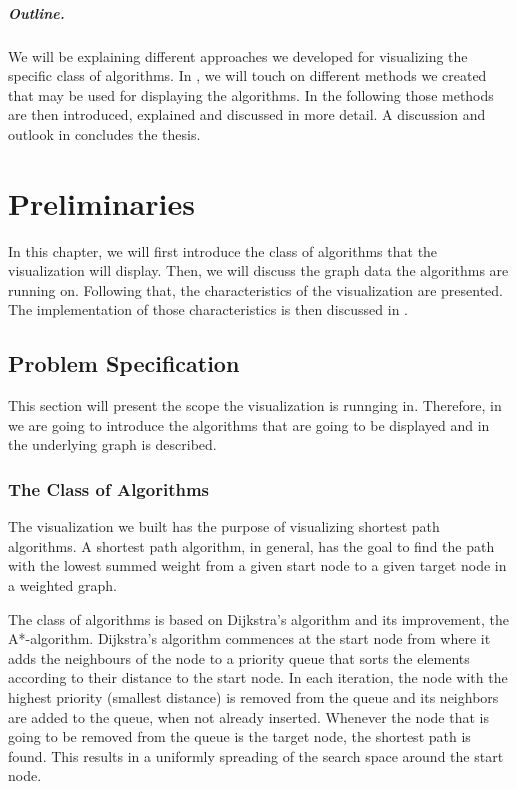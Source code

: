 \documentclass
[
    paper = a4,
    pagesize,
    12 pt,
    oneside,                       %
    open = right,
    DIV = calc,
    BCOR = 0 mm,                   %
    bibtotoc
]
{scrbook}
\begin{document}
\paragraph{Outline.} We will be explaining different approaches we developed for visualizing the specific class of algorithms.
In , we will touch on different methods we created that may be used for displaying the algorithms.
In the following  those methods are then introduced, explained and discussed in more detail.
A discussion and outlook in  concludes the thesis.


\chapter{Preliminaries} \label{questions}

In this chapter, we will first introduce the class of algorithms that the visualization will display.
Then, we will discuss the graph data the algorithms are running on.
Following that, the characteristics of the visualization are presented.
The implementation of those characteristics is then discussed in .


\section{Problem Specification} \label{specification}

This section will present the scope the visualization is runnging in.
Therefore, in  we are going to introduce the algorithms that are going to be displayed and in  the underlying graph is described.

\subsection{The Class of Algorithms} \label{framework}

The visualization we built has the purpose of visualizing shortest path algorithms.
A shortest path algorithm, in general, has the goal to find the path with the lowest summed weight from a given start node to a given target node in a weighted graph.

The class of algorithms is based on Dijkstra's algorithm\cite{DIJKSTRA1959} and its improvement, the A*-algorithm\cite{4082128}.
Dijkstra's algorithm commences at the start node from where it adds the neighbours of the node to a priority queue that sorts the elements according to their distance to the start node.
In each iteration, the node with the highest priority (smallest distance) is removed from the queue and its neighbors are added to the queue, when not already inserted.
Whenever the node that is going to be removed from the queue is the target node, the shortest path is found.
This results in a uniformly spreading of the search space around the start node.
\end{document}
